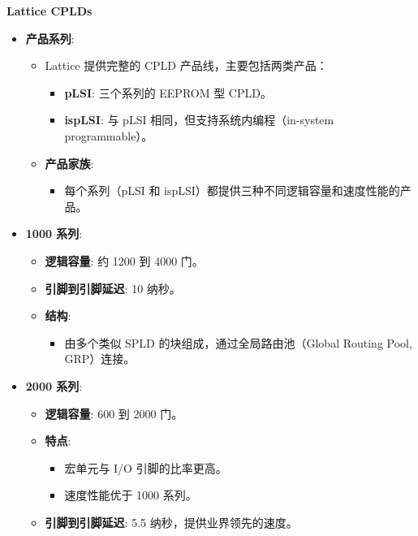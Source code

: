 \documentclass[
  ignorenonframetext,
  chinese,
]{beamer}
\providecommand{\tightlist}{%
  \setlength{\itemsep}{0pt}\setlength{\parskip}{0pt}}
\begin{document}
\begin{frame}
\begin{block}{\textbf{Lattice CPLDs}}
\label{lattice-cplds}
\small
\begin{itemize}
\tightlist
\item
  \textbf{产品系列}:

  \begin{itemize}
  \tightlist
  \item
    Lattice 提供完整的 CPLD 产品线，主要包括两类产品：

    \begin{itemize}
    \tightlist
    \item
      \textbf{pLSI}: 三个系列的 EEPROM 型 CPLD。
    \item
      \textbf{ispLSI}: 与 pLSI 相同，但支持系统内编程（in-system
      programmable）。
    \end{itemize}
  \item
    \textbf{产品家族}:

    \begin{itemize}
    \tightlist
    \item
      每个系列（pLSI 和 ispLSI）都提供三种不同逻辑容量和速度性能的产品。
    \end{itemize}
  \end{itemize}
\item
  \textbf{1000 系列}:

  \begin{itemize}
  \tightlist
  \item
    \textbf{逻辑容量}: 约 1200 到 4000 门。
  \item
    \textbf{引脚到引脚延迟}: 10 纳秒。
  \item
    \textbf{结构}:

    \begin{itemize}
    \tightlist
    \item
      由多个类似 SPLD 的块组成，通过全局路由池（Global Routing Pool,
      GRP）连接。
    \end{itemize}
  \end{itemize}
\item
  \textbf{2000 系列}:

  \begin{itemize}
  \tightlist
  \item
    \textbf{逻辑容量}: 600 到 2000 门。
  \item
    \textbf{特点}:

    \begin{itemize}
    \tightlist
    \item
      宏单元与 I/O 引脚的比率更高。
    \item
      速度性能优于 1000 系列。
    \end{itemize}
  \item
    \textbf{引脚到引脚延迟}: 5.5 纳秒，提供业界领先的速度。
  \end{itemize}
\end{itemize}
\end{block}
\end{frame}
\end{document}
